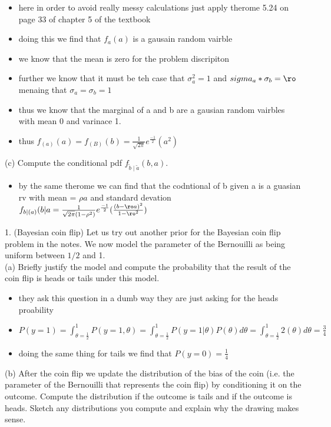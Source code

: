 \documentclass[10pt]{article}
\begin{document}
\begin{itemize}
    \item here in order to avoid really messy calculations just apply therome 5.24 on page 33 of chapter 5 of the textbook 
    \item doing this we find that $f_{a}(a)$ is a gausain random vairble
    \item we know that the mean is zero for the problem discripiton 
    \item further we know that it must be teh case that $\sigma_a^2=1$ and $sigma_a*\sigma_b=\ro$ menaing that $\sigma_a=\sigma_b=1$
    \item thus we know that the marginal of a and b are a gausian random vairbles with mean 0 and varinace 1. 
    \item thus $f_(a)(a)=f_(B)(b)=\frac{1}{\sqrt{2\pi}}e^{\frac{-1}{2}}(a^2)$
 \end{itemize}
(c) Compute the conditional pdf $f_{\tilde{b} \mid \tilde{a}}(b, a)$.
\begin{itemize}
    \item by the same therome we can find that the codntional of b given a is a guasian rv with mean = $\rho a$ and standard devation $f_{b|(a)}(b|a=\frac{1}{\sqrt{2\pi}(1-\rho^2)}e^{\frac{-1}{2}}(\frac{(b-\ro a)^2}{1-\ro^2})$
\end{itemize}
1. (Bayesian coin flip) Let us try out another prior for the Bayesian coin flip problem in the notes. We now model the parameter of the Bernouilli as being uniform between $1 / 2$ and 1.
\\(a) Briefly justify the model and compute the probability that the result of the coin flip is heads or tails under this model.
\begin{itemize}
    \item they ask this question in a dumb way they are just asking for the heads proability 
    \item $P(y=1)=\int_{\theta=\frac{1}{2}}^{1}P(y=1,\theta)=\int_{\theta=\frac{1}{2}}^{1}P(y=1|\theta)P(\theta)d\theta=\int_{\theta=\frac{1}{2}}^{1}2(\theta)d\theta=\frac{3}{4}$
    \item doing the same thing for tails we find that $P(y=0)=\frac{1}{4}$
\end{itemize}
(b) After the coin flip we update the distribution of the bias of the coin (i.e. the parameter of the Bernouilli that represents the coin flip) by conditioning it on the outcome. Compute the distribution if the outcome is tails and if the outcome is heads. Sketch any distributions you compute and explain why the drawing makes sense.
\end{document}

